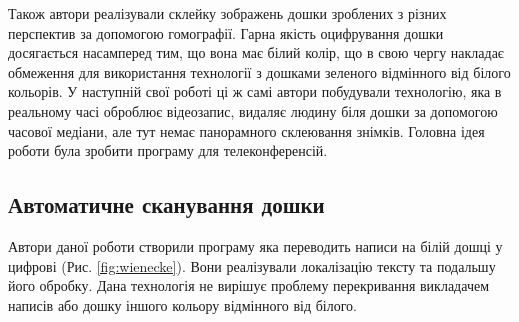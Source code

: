Також автори реалізували склейку зображень дошки зроблених з різних
перспектив за допомогою гомографії. Гарна якість оцифрування дошки
досягається насамперед тим, що вона має білий колір, що в свою чергу
накладає обмеження для використання технології з дошками зеленого відмінного
від білого кольорів.
У наступній свої роботі \cite{zhang:2007} ці ж самі автори побудували
технологію, яка в реальному часі оброблює відеозапис, видаляє людину біля
дошки за допомогою часової медіани, але тут немає
панорамного склеювання знімків. Головна ідея роботи була зробити
програму для телеконференсій.

\subsection{Автоматичне сканування дошки}

Автори даної роботи \cite{wienecke} створили програму яка переводить написи на білій
дошці у цифрові (Рис. \ref{fig:wienecke}). Вони реалізували локалізацію тексту та подальшу
його обробку. Дана технологія не вирішує проблему перекривання викладачем написів
або дошку іншого кольору відмінного від білого.

